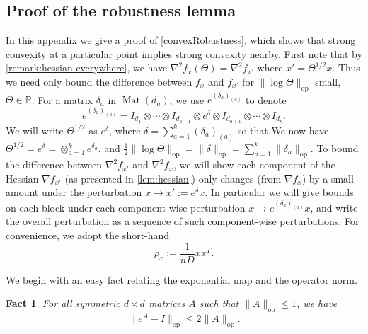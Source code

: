 \documentclass[aos]{imsart}
\newtheorem{fact}[theorem]{Fact}
\theoremstyle{definition}
\numberwithin{equation}{section}
\DeclareMathOperator{\op}{op}
\DeclareMathOperator{\Mat}{Mat}
\renewcommand{\P}{{\mathbb{P}}}
\newcommand{\samp}{x}
\newcommand{\MW}[1]{{\color{red}[MW: #1]}}
\newcommand{\MW}[1]{{}}
\begin{document}
\begin{appendix}

\section{Proof of the robustness lemma}\label{app:robust}
In this appendix we give a proof of \cref{convexRobustness}, which shows that strong convexity at a particular point implies strong convexity nearby.
First note that by \cref{remark:hessian-everywhere}, we have $\nabla^2 f_\samp(\Theta) = \nabla^2 f_{\samp'}$ where $\samp' = \Theta^{1/2} \samp$.
Thus we need only bound the difference between $f_\samp$ and $f_{\samp'}$ for $\|\log \Theta\|_{\op}$ small, $\Theta \in \P$.
For a matrix $\delta_{a}$ in $\Mat(d_a)$, we use
$e^{(\delta_{a})_{(a)}}$ to denote
$$ e^{(\delta_{a})_{(a)}} = I_{d_1} \otimes \cdots \otimes I_{d_{a-1}} \otimes e^{\delta} \otimes I_{d_{a+1}} \otimes \cdots \otimes I_{d_k}.$$
We will write $\Theta^{1/2}$ as $e^{\delta}$, where $\delta = \sum_{a=1}^k (\delta_{a})_{(a)}$ so that
We now have
$\Theta^{1/2} = e^{\delta} = \otimes_{a = 1}^k e^{\delta_a}$, and $\frac{1}{2}\|\log \Theta\|_{\op} = \|\delta\|_{\op} = \sum_{a =1}^k \|\delta_{a}\|_{\op}$.
To bound the difference between $\nabla^2 f_{x'}$ and $\nabla^2 f_x$, we will show each component of the Hessian $\nabla f_{x'}$ (as presented in \cref{lem:hessian}) only changes (from $\nabla f_x$) by a small amount under the perturbation $x \to x' := e^\delta x$.
In particular we will give bounds on each block under each component-wise perturbation $x \to e^{(\delta_{a})_{(a)}} x$, and write the overall perturbation as a sequence of such component-wise perturbations. For convenience, we adopt the short-hand
$$ \rho_x:= \frac{1}{nD} x x^T.$$



We begin with an easy fact relating the exponential map and the operator norm.

\begin{fact} \label{f:expTaylor} For all symmetric $d\times d$ matrices $A$ such that $ \|A\|_{\op} \leq 1$, we have
$$ \|e^{A} - I\|_{\op} \leq 2 \|A\|_{\op}.$$
\end{fact}



\end{appendix}
\end{document}
